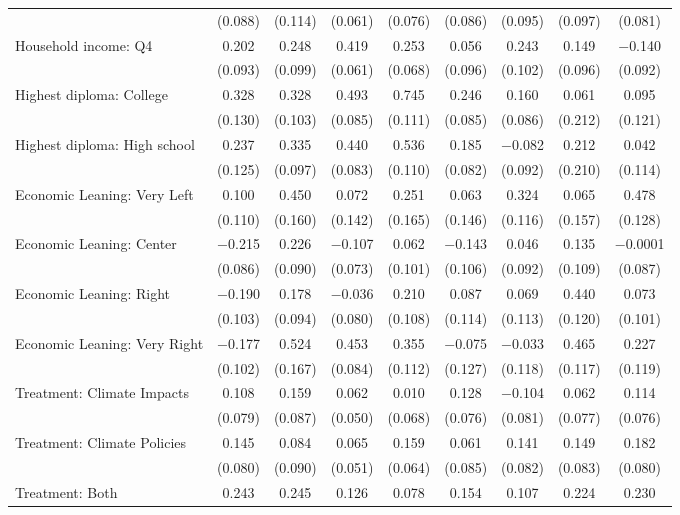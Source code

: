 \begin{tabular}{@{\extracolsep{5pt}}lcccccccc}
  & (0.088) & (0.114) & (0.061) & (0.076) & (0.086) & (0.095) & (0.097) & (0.081) \\ 
  Household income: Q4 & 0.202 & 0.248 & 0.419 & 0.253 & 0.056 & 0.243 & 0.149 & $-$0.140 \\ 
  & (0.093) & (0.099) & (0.061) & (0.068) & (0.096) & (0.102) & (0.096) & (0.092) \\ 
  Highest diploma: College & 0.328 & 0.328 & 0.493 & 0.745 & 0.246 & 0.160 & 0.061 & 0.095 \\ 
  & (0.130) & (0.103) & (0.085) & (0.111) & (0.085) & (0.086) & (0.212) & (0.121) \\ 
  Highest diploma: High school & 0.237 & 0.335 & 0.440 & 0.536 & 0.185 & $-$0.082 & 0.212 & 0.042 \\ 
  & (0.125) & (0.097) & (0.083) & (0.110) & (0.082) & (0.092) & (0.210) & (0.114) \\ 
  Economic Leaning: Very Left & 0.100 & 0.450 & 0.072 & 0.251 & 0.063 & 0.324 & 0.065 & 0.478 \\ 
  & (0.110) & (0.160) & (0.142) & (0.165) & (0.146) & (0.116) & (0.157) & (0.128) \\ 
  Economic Leaning: Center & $-$0.215 & 0.226 & $-$0.107 & 0.062 & $-$0.143 & 0.046 & 0.135 & $-$0.0001 \\ 
  & (0.086) & (0.090) & (0.073) & (0.101) & (0.106) & (0.092) & (0.109) & (0.087) \\ 
  Economic Leaning: Right & $-$0.190 & 0.178 & $-$0.036 & 0.210 & 0.087 & 0.069 & 0.440 & 0.073 \\ 
  & (0.103) & (0.094) & (0.080) & (0.108) & (0.114) & (0.113) & (0.120) & (0.101) \\ 
  Economic Leaning: Very Right & $-$0.177 & 0.524 & 0.453 & 0.355 & $-$0.075 & $-$0.033 & 0.465 & 0.227 \\ 
  & (0.102) & (0.167) & (0.084) & (0.112) & (0.127) & (0.118) & (0.117) & (0.119) \\ 
  Treatment: Climate Impacts & 0.108 & 0.159 & 0.062 & 0.010 & 0.128 & $-$0.104 & 0.062 & 0.114 \\ 
  & (0.079) & (0.087) & (0.050) & (0.068) & (0.076) & (0.081) & (0.077) & (0.076) \\ 
  Treatment: Climate Policies & 0.145 & 0.084 & 0.065 & 0.159 & 0.061 & 0.141 & 0.149 & 0.182 \\ 
  & (0.080) & (0.090) & (0.051) & (0.064) & (0.085) & (0.082) & (0.083) & (0.080) \\ 
  Treatment: Both & 0.243 & 0.245 & 0.126 & 0.078 & 0.154 & 0.107 & 0.224 & 0.230 \\ 

\end{tabular}
